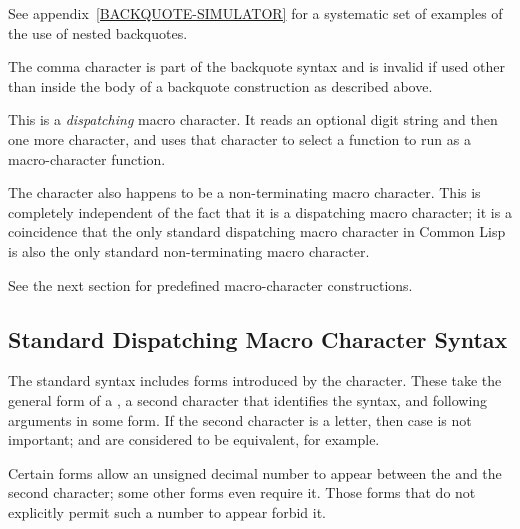 \begin{flushdesc}
\begin{new}
See appendix~\ref{BACKQUOTE-SIMULATOR} for a systematic set of examples
of the use of nested backquotes.
\end{new}

\item[\cd{,}]
The comma character is part of the backquote syntax
and is invalid if used other than inside the body of a backquote
construction as described above.

\item[\cd{\#}]
This is a {\it dispatching} macro character.
It reads an optional digit string and then one more character,
and uses that character to select a function to run as a macro-character
function.

The \cd{\#} character also happens to be a non-terminating
macro character.  This is completely independent of the fact that
it is a dispatching macro character; it is a coincidence that
the only standard dispatching macro character in Common Lisp is
also the only standard non-terminating macro character.

See the next section for predefined \cd{\#} macro-character constructions.
\end{flushdesc}

\subsection{Standard Dispatching Macro Character Syntax}
\label{SHARP-SIGN-MACRO-CHARACTER-SECTION}

The standard syntax includes forms introduced by the \cd{\#} character.
These take the general form of a \cd{\#},
a second character that identifies the syntax,
and following arguments in some form.
If the second character is a letter, then case is not important;
 and  are considered to be equivalent, for example.

Certain \cd{\#} forms allow an unsigned decimal number to appear
between the \cd{\#} and the second character; some other
forms even require it.  Those forms that do not explicitly permit
such a number to appear forbid it.

